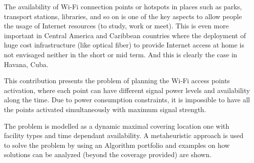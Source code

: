 
The availability of Wi-Fi connection points or hotspots in places such as parks, transport stations, libraries, and so on is one of the key aspects to allow people the usage of Internet resources (to study, work or meet).
This is even more important in Central America and Caribbean countries where the deployment of huge cost infrastructure (like optical fiber) to provide Internet access at home is not envisaged neither in the short or mid term. And this is clearly the case in Havana, Cuba. 

This contribution presents the problem of planning the Wi-Fi access points activation, where each point can have different signal power levels and availability along the time. Due to power consumption constraints, it is impossible to have all the points activated simultaneously with maximum signal strength.

The problem is modelled as a dynamic maximal covering location one with facility types and time dependant availability. A metaheuristic approach is used to solve the problem by using an Algorithm portfolio and examples on how solutions can be analyzed (beyond the coverage provided)  are shown.


